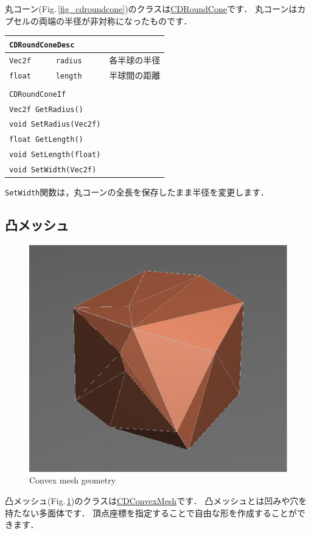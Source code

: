 \KLUDGE 丸コーン(Fig.\,\ref{fig_cdroundcone})のクラスは\url{CDRoundCone}です．
\KLUDGE 丸コーンはカプセルの両端の半径が非対称になったものです．

\begin{center}
\begin{tabular}{lll}
\multicolumn{3}{l}{\texttt{CDRoundConeDesc}}			\\ \midrule
\texttt{Vec2f}	&	\texttt{radius}	& 各半球の半径		\\
\texttt{float}	&	\texttt{length} & 半球間の距離		\\
\\
\multicolumn{3}{l}{\texttt{CDRoundConeIf}}				\\ \midrule
\multicolumn{2}{l}{\texttt{Vec2f GetRadius()}}			\\
\multicolumn{2}{l}{\texttt{void SetRadius(Vec2f)}}		\\
\multicolumn{2}{l}{\texttt{float GetLength()}}			\\
\multicolumn{2}{l}{\texttt{void SetLength(float)}}		\\
\multicolumn{2}{l}{\texttt{void SetWidth(Vec2f)}}		\\
\end{tabular}
\end{center}

\texttt{SetWidth}関数は，丸コーンの全長を保存したまま半径を変更します．


\subsection*{凸メッシュ}

\begin{figure}[t]
\begin{center}
\includegraphics[width=.4\hsize]{fig/cdconvexmesh.eps}
\end{center}
\caption{Convex mesh geometry}
\label{fig_cdconvexmesh}
\end{figure}

\KLUDGE 凸メッシュ(Fig.\,\ref{fig_cdconvexmesh})のクラスは\url{CDConvexMesh}です．
\KLUDGE 凸メッシュとは凹みや穴を持たない多面体です．
\KLUDGE 頂点座標を指定することで自由な形を作成することができます．

